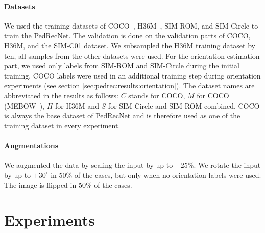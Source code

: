 \documentclass[a4paper, 10pt, conference]{ieeeconf}
\begin{document}
\paragraph{Datasets}
We used the training datasets of COCO~\cite{linMicrosoftCOCOCommon2014}, H36M~\cite{ionescuHuman36MLarge2014}, SIM-ROM, and SIM-Circle to train the PedRecNet. The validation is done on the validation parts of COCO, H36M, and the SIM-C01 dataset. We subsampled the H36M training dataset by ten, all samples from the other datasets were used. For the orientation estimation part, we used only labels from SIM-ROM and SIM-Circle during the initial training. COCO labels were used in an additional training step during orientation experiments (see section \ref{sec:pedrec:results:orientation}). The dataset names are abbreviated in the results as follows: $C$ stands for COCO, $M$ for COCO (MEBOW~\cite{wuMEBOWMonocularEstimation2020}), $H$ for H36M and $S$ for SIM-Circle and SIM-ROM combined. COCO is always the base dataset of PedRecNet and is therefore used as one of the training dataset in every experiment.

\paragraph{Augmentations} We augmented the data by scaling the input by up to $\pm 25\%$. We rotate the input by up to $\pm 30^{\circ}$ in $50\%$ of the cases, but only when no orientation labels were used. The image is flipped in $50\%$ of the cases.

\section{Experiments}
\end{document}
